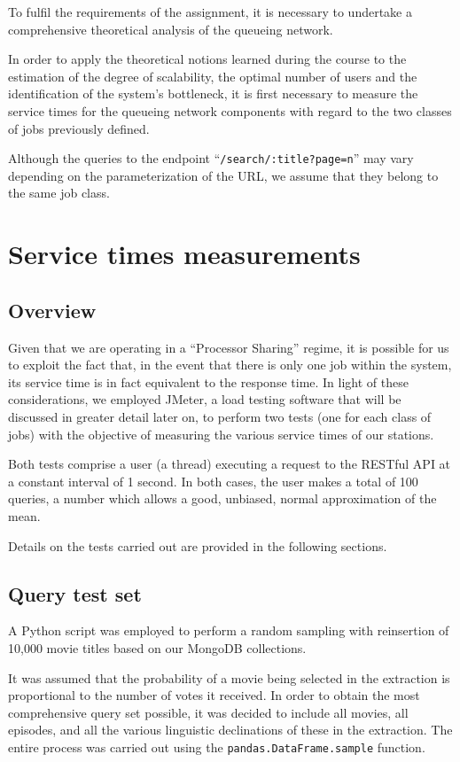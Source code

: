 To fulfil the requirements of the assignment, it is necessary to undertake a comprehensive theoretical analysis of the queueing network.

In order to apply the theoretical notions learned during the course to the estimation of the degree of scalability, the optimal number of users and the identification of the system's bottleneck, it is first necessary to measure the service times for the queueing network components with regard to the two classes of jobs previously defined.

Although the queries to the endpoint ``\verb|/search/:title?page=n|'' may vary depending on the parameterization of the URL, we assume that they belong to the same job class.

\section{Service times measurements}

\subsection{Overview}

Given that we are operating in a ``Processor Sharing'' regime, it is possible for us to exploit the fact that, in the event that there is only one job within the system, its service time is in fact equivalent to the response time.
In light of these considerations, we employed JMeter, a load testing software that will be discussed in greater detail later on, to perform two tests (one for each class of jobs) with the objective of measuring the various service times of our stations.

Both tests comprise a user (a thread) executing a request to the RESTful API at a constant interval of 1 second.
In both cases, the user makes a total of 100 queries, a number which allows a good, unbiased, normal approximation of the mean.

Details on the tests carried out are provided in the following sections.

\subsection{Query test set}

A Python script was employed to perform a random sampling with reinsertion of 10,000 movie titles based on our MongoDB collections.

It was assumed that the probability of a movie being selected in the extraction is proportional to the number of votes it received.
In order to obtain the most comprehensive query set possible, it was decided to include all movies, all episodes, and all the various linguistic declinations of these in the extraction.
The entire process was carried out using the \verb|pandas.DataFrame.sample| function.

